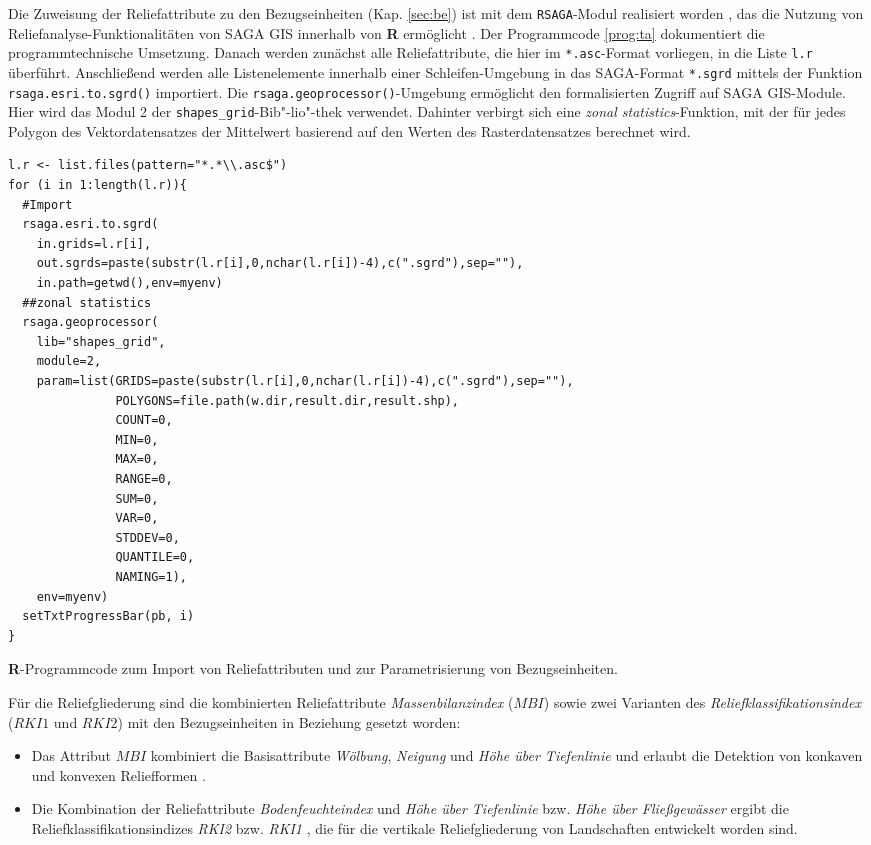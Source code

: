 Die Zuweisung der Reliefattribute zu den Bezugseinheiten (Kap. \ref{sec:be}) ist mit dem \texttt{RSAGA}-Modul realisiert worden \citep{Brenning2008rsaga}, das die Nutzung von Reliefanalyse-Funktionalitäten von SAGA GIS innerhalb von \textbf{R} ermöglicht \citep{Conrad-etal2015gmd}. Der Programmcode \ref{prog:ta} dokumentiert die programmtechnische Umsetzung. Danach werden zunächst alle Reliefattribute, die hier im \texttt{*.asc}-Format vorliegen, in die Liste \texttt{l.r} überführt. Anschließend werden alle Listenelemente innerhalb einer Schleifen-Umgebung in das SAGA-Format \texttt{*.sgrd} mittels der Funktion \texttt{rsaga.esri.to.sgrd()} importiert. Die \texttt{rsaga.geoprocessor()}-Umgebung ermöglicht den formalisierten Zugriff auf SAGA GIS-Module. Hier wird das Modul 2 der \texttt{shapes\_grid}-Bib"-lio"-thek verwendet. Dahinter verbirgt sich eine \textit{zonal statistics}-Funktion, mit der für jedes Polygon des Vektordatensatzes der Mittelwert basierend auf den Werten des Rasterdatensatzes berechnet wird.


\begin{program}[t] 
\begin{verbatim}
l.r <- list.files(pattern="*.*\\.asc$") 
for (i in 1:length(l.r)){
  #Import
  rsaga.esri.to.sgrd(
    in.grids=l.r[i], 
    out.sgrds=paste(substr(l.r[i],0,nchar(l.r[i])-4),c(".sgrd"),sep=""), 
    in.path=getwd(),env=myenv)
  ##zonal statistics
  rsaga.geoprocessor(
    lib="shapes_grid",
    module=2,
    param=list(GRIDS=paste(substr(l.r[i],0,nchar(l.r[i])-4),c(".sgrd"),sep=""),
               POLYGONS=file.path(w.dir,result.dir,result.shp),
               COUNT=0,
               MIN=0,
               MAX=0,
               RANGE=0,
               SUM=0,
               VAR=0,
               STDDEV=0,
               QUANTILE=0,
               NAMING=1),
    env=myenv)
  setTxtProgressBar(pb, i)
}
\end{verbatim}
\caption{\textbf{R}-Programmcode zum Import von Reliefattributen und zur Parametrisierung von Bezugseinheiten.} 
\label{prog:ta} 
\end{program} 

Für die Reliefgliederung sind die kombinierten Reliefattribute \textit{Massenbilanzindex} ($MBI$) sowie zwei Varianten des \textit{Reliefklassifikationsindex} ($RKI1$ und $RKI2$) mit den Bezugseinheiten in Beziehung gesetzt worden:

\begin{itemize}
	\item Das Attribut $MBI$ kombiniert die Basisattribute \textit{Wölbung}, \textit{Neigung} und \textit{Höhe über Tiefenlinie} und erlaubt die Detektion von konkaven und konvexen Reliefformen \citep{Moeller-etal2008jpnss,Moeller-etal2012catena,MoellerVolk2015geoderma}.
	\item Die Kombination der Reliefattribute \textit{Bodenfeuchteindex} und \textit{Höhe über Tiefenlinie} bzw. \textit{Höhe über Fließgewässer}   ergibt die Reliefklassifikationsindizes \textit{RKI2} bzw. \textit{RKI1} \citep{Bock-etal2007}, die für die vertikale Reliefgliederung von Landschaften entwickelt worden sind.
\end{itemize}

